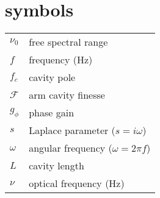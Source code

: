 \section{symbols}

\begin{tabular}{|l|l|}
\hline
$\nu_0$         & free spectral range \\
$f$             & frequency (Hz) \\
$f_c$           & cavity pole \\
$\mathcal{F}$   & arm cavity finesse \\
$g_\phi$         & phase gain \\
$s$             & Laplace parameter ($s=i\omega$) \\
$\omega$        & angular frequency ($\omega=2\pi f$) \\
$L$             & cavity length \\
$\nu$           & optical frequency (Hz) \\
\hline
\end{tabular}
